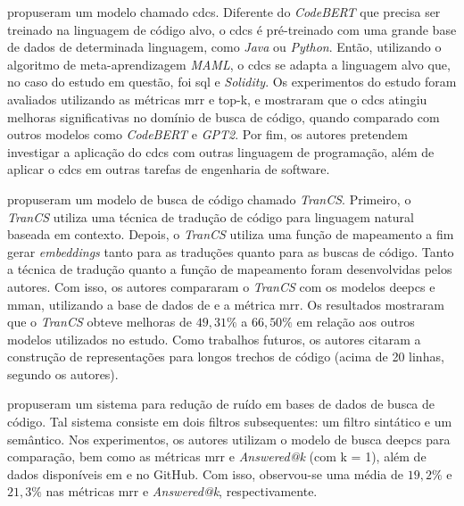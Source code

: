 \textcite{Chai2022CrossDomainDC} propuseram um modelo chamado \gls{cdcs}. Diferente do \textit{CodeBERT} que precisa ser treinado na linguagem de código alvo, o \gls{cdcs} é pré-treinado com uma grande base de dados de determinada linguagem, como \textit{Java} ou \textit{Python}. Então, utilizando o algoritmo de meta-aprendizagem \textit{MAML}, o \gls{cdcs} se adapta a linguagem alvo que, no caso do estudo em questão, foi \gls{sql} e \textit{Solidity}. Os experimentos do estudo foram avaliados utilizando as métricas \gls{mrr} e top-k, e mostraram que o \gls{cdcs} atingiu melhoras significativas no domínio de busca de código, quando comparado com outros modelos como \textit{CodeBERT} e \textit{GPT2}. Por fim, os autores pretendem investigar a aplicação do \gls{cdcs} com outras linguagem de programação, além de aplicar o \gls{cdcs} em outras tarefas de engenharia de software.

\textcite{Sun2022CodeSB} propuseram um modelo de busca de código chamado \textit{TranCS}. Primeiro, o \textit{TranCS} utiliza uma técnica de tradução de código para linguagem natural baseada em contexto. Depois, o \textit{TranCS} utiliza uma função de mapeamento a fim gerar \textit{embeddings} tanto para as traduções quanto para as buscas de código. Tanto a técnica de tradução quanto a função de mapeamento foram desenvolvidas pelos autores.
Com isso, os autores compararam o \textit{TranCS} com os modelos \gls{deepcs} e \gls{mman}, utilizando a base de dados de \cite{Husain2019CodeSearchNetCE} e a métrica \gls{mrr}. Os resultados mostraram que o \textit{TranCS} obteve melhoras de $49,31\%$ a $66,50\%$ em relação aos outros modelos utilizados no estudo. Como trabalhos futuros, os autores citaram a construção de representações para longos trechos de código (acima de 20 linhas, segundo os autores).

\textcite{Sun2022OnTI} propuseram um sistema para redução de ruído em bases de dados de busca de código. Tal sistema consiste em dois filtros subsequentes: um filtro sintático e um semântico. Nos experimentos, os autores utilizam o modelo de busca \gls{deepcs} para comparação, bem como as métricas \gls{mrr} e \textit{Answered@k} (com k = 1), além de dados disponíveis em \cite{Husain2019CodeSearchNetCE} e no GitHub. Com isso, observou-se uma média de $19,2\%$ e $21,3\%$ nas métricas \gls{mrr} e \textit{Answered@k}, respectivamente.

